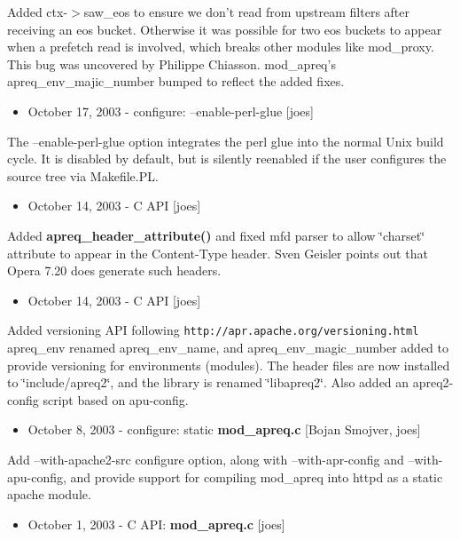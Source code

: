 Added ctx-$>$saw\_\-eos to ensure we don't read from upstream filters after receiving an eos bucket. Otherwise it was possible for two eos buckets to appear when a prefetch read is involved, which breaks other modules like mod\_\-proxy. This bug was uncovered by Philippe Chiasson. mod\_\-apreq's apreq\_\-env\_\-majic\_\-number bumped to reflect the added fixes.

\begin{itemize}
\item October 17, 2003 - configure: --enable-perl-glue [joes]\end{itemize}


The --enable-perl-glue option integrates the perl glue into the normal Unix build cycle. It is disabled by default, but is silently reenabled if the user configures the source tree via Makefile.PL.

\begin{itemize}
\item October 14, 2003 - C API [joes]\end{itemize}


Added {\bf apreq\_\-header\_\-attribute()} and fixed mfd parser to allow \char`\"{}charset\char`\"{} attribute to appear in the Content-Type header. Sven Geisler points out that Opera 7.20 does generate such headers.

\begin{itemize}
\item October 14, 2003 - C API [joes]\end{itemize}


Added versioning API following {\tt http://apr.apache.org/versioning.html} apreq\_\-env renamed apreq\_\-env\_\-name, and apreq\_\-env\_\-magic\_\-number added to provide versioning for environments (modules). The header files are now installed to \char`\"{}include/apreq2\char`\"{}, and the library is renamed \char`\"{}libapreq2\char`\"{}. Also added an apreq2-config script based on apu-config.

\begin{itemize}
\item October 8, 2003 - configure: static {\bf mod\_\-apreq.c} [Bojan Smojver, joes]\end{itemize}


Add --with-apache2-src configure option, along with --with-apr-config and --with-apu-config, and provide support for compiling mod\_\-apreq into httpd as a static apache module.

\begin{itemize}
\item October 1, 2003 - C API: {\bf mod\_\-apreq.c} [joes]\end{itemize}



